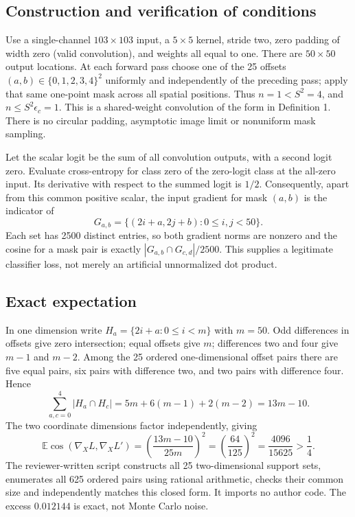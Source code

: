 \documentclass[10pt]{article}
\begin{document}
\subsection*{Construction and verification of conditions}
Use a single-channel \(103\times103\) input, a \(5\times5\) kernel, stride two, zero padding of width zero (valid convolution), and weights all equal to one. There are \(50\times50\) output locations. At each forward pass choose one of the 25 offsets \((a,b)\in\{0,1,2,3,4\}^2\) uniformly and independently of the preceding pass; apply that same one-point mask across all spatial positions. Thus \(n=1<S^2=4\), and \(n\le S^2\epsilon_c=1\). This is a shared-weight convolution of the form in Definition 1. There is no circular padding, asymptotic image limit or nonuniform mask sampling.\par
Let the scalar logit be the sum of all convolution outputs, with a second logit zero. Evaluate cross-entropy for class zero of the zero-logit class at the all-zero input. Its derivative with respect to the summed logit is \(1/2\). Consequently, apart from this common positive scalar, the input gradient for mask \((a,b)\) is the indicator of \[G_{a,b}=\{(2i+a,2j+b):0\le i,j<50\}.\] Each set has 2500 distinct entries, so both gradient norms are nonzero and the cosine for a mask pair is exactly \(|G_{a,b}\cap G_{c,d}|/2500\). This supplies a legitimate classifier loss, not merely an artificial unnormalized dot product.\par
\subsection*{Exact expectation}
In one dimension write \(H_a=\{2i+a:0\le i<m\}\) with \(m=50\). Odd differences in offsets give zero intersection; equal offsets give \(m\); differences two and four give \(m-1\) and \(m-2\). Among the 25 ordered one-dimensional offset pairs there are five equal pairs, six pairs with difference two, and two pairs with difference four. Hence \[\sum_{a,c=0}^4 |H_a\cap H_c|=5m+6(m-1)+2(m-2)=13m-10.\] The two coordinate dimensions factor independently, giving \[\mathbb E\cos(\nabla_X L,\nabla_X L')=
\left(\frac{13m-10}{25m}\right)^2
=\left(\frac{64}{125}\right)^2=\frac{4096}{15625}>\frac14.\] The reviewer-written script constructs all 25 two-dimensional support sets, enumerates all 625 ordered pairs using rational arithmetic, checks their common size and independently matches this closed form. It imports no author code. The excess \(0.012144\) is exact, not Monte Carlo noise.\par
\end{document}
